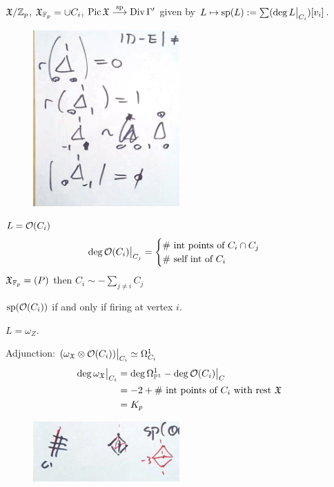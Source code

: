 $\fX/\Z_p$, $\fX_{\F_p}= \cup C_i$, $\pic \fX \ma{\sp} \div \Gamma'$ given by $L \mapsto \sp(L):= \sum (\deg L \big|_{C_i})[v_i]$.

	\begin{figure}[!ht]
	\centering
	\includegraphics[width=0.5\textwidth]{../images/im26.png}
	\end{figure}


\begin{ex}
$L= \O(C_i)$
	\[
	\deg \O(C_i) \big|_{C_j}=
	\begin{cases}
	\# \text{ int points of } C_i \cap C_j \\
	\# \text{ self int of } C_i
	\end{cases}
	\]
$\fX_{\F_p}= (P)$ then $C_i \sim - \sum_{j \neq i} C_j$

$\sp(\O(C_i))$ if and only if firing at vertex $i$.
\end{ex}


\begin{ex}
$L= \omega_Z$.

Adjunction: $(\omega_\fX \otimes \O(C_i)) \big|_{C_i} \simeq \Omega^1_{C_i}$
	\[
	\begin{aligned}
	\deg \omega_\fX \big|_{C_i}&= \deg \Omega^1_{\P^1} - \deg \O(C_i) \big|_C \\
	&= -2 + \#\text{ int points of }C_i \text{ with rest }\fX \\
	&= K_p
	\end{aligned}
	\]

	\begin{figure}[!ht]
	\centering
	\includegraphics[width=0.5\textwidth]{../images/im28.png}
	\end{figure}
\end{ex}


